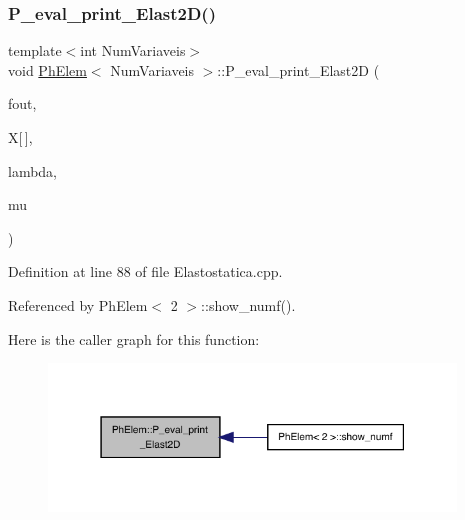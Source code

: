 \subsubsection{\texorpdfstring{P\+\_\+eval\+\_\+print\+\_\+\+Elast2\+D()}{P\_eval\_print\_Elast2D()}}
{\footnotesize\ttfamily template$<$int Num\+Variaveis$>$ \\
void \hyperlink{classPhElem}{Ph\+Elem}$<$ Num\+Variaveis $>$\+::P\+\_\+eval\+\_\+print\+\_\+\+Elast2D (\begin{DoxyParamCaption}\item[{F\+I\+LE $\ast$}]{fout,  }\item[{const double}]{X\mbox{[}$\,$\mbox{]},  }\item[{double}]{lambda,  }\item[{double}]{mu }\end{DoxyParamCaption})}



Definition at line 88 of file Elastostatica.\+cpp.



Referenced by Ph\+Elem$<$ 2 $>$\+::show\+\_\+numf().

Here is the caller graph for this function\+:
\nopagebreak
\begin{figure}[H]
\begin{center}
\leavevmode
\includegraphics[width=307pt]{classPhElem_ac3bc9b0559e940faa2404b1541d0c403_icgraph}
\end{center}
\end{figure}
\mbox{\label{classPhElem_a467c1ae6065913d0ec9828c9d055539a}} 
